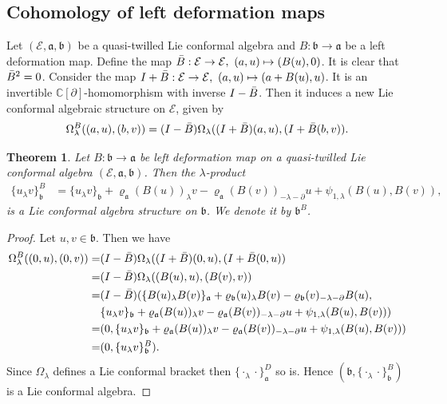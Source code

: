 \documentclass[a4paper,11pt]{article}
\def\Ep{\mathcal{E}}
\def\Vs{\mathfrak{a}}
\def\Ws{\mathfrak{b}}
\def\rep{\varrho}
\def\la{\lambda}
\def\p{\partial}
\numberwithin{equation}{section}
\newtheorem{theorem}{Theorem}[section]
\begin{document}
\subsection{Cohomology of left deformation maps}
\label{subsec:cohom-I}

Let $(\Ep,\Vs,\Ws)$ be a quasi-twilled Lie conformal algebra and
$B: \Ws\to\Vs$ be a left deformation map. Define the map $\Bar{B}: \Ep \to \Ep,\ (a,u) \mapsto (B(u),0)$. It is  clear that $\Bar{B}^2=0$. 
Consider the map $I+\Bar{B}: \Ep \to \Ep,\ (a,u) \mapsto (a+B(u),u)$. It is an invertible $\mathbb{C}[\partial]$-homomorphism with inverse $I-\Bar{B}$. Then it induces a new Lie conformal algebraic structure on $\Ep$, given by 
\begin{align*}
\Omega^B_\lambda((a,u) ,(b,v))=(I-\Bar{B})\Omega_\lambda((I+\Bar{B})(a,u), (I+\Bar{B}(b,v)).     
\end{align*}

\begin{theorem}
Let $B: \Ws \to \Vs$ be left deformation map on a quasi-twilled Lie conformal algebra $(\Ep,\Vs,\Ws)$. Then the $\la$-product 
\begin{align}
 \{u_\la v\}^B_\Ws
  &= \{u_\la v\}_\Ws + \rep_\Vs(B(u))_\la v - \rep_\Vs(B(v))_{-\la-\p}u
     + \psi_{1,\la}(B(u),B(v)), 
  \label{eq:induced-bracket-II}   
\end{align}
is a Lie conformal algebra structure on $\Ws$. We denote it by $\Ws^B$. 
\end{theorem}

\begin{proof}
Let $u,v \in \Ws$. Then we have
\begin{align*}
\Omega^B_\lambda((0,u) ,(0,v))=& (I-\Bar{B})\Omega_\lambda((I+\Bar{B})(0,u), (I+\Bar{B}(0,u))\\
=& (I-\Bar{B})\Omega_\lambda((B(u),u),(B(v),v)) \\
=&(I-\Bar{B})(\{B(u)_\la B(v)\}_\Vs
  + \rep_\Ws(u)_\la B(v) - \rep_\Ws(v)_{-\la-\p}B(u),\\
  & \{u_\la v\}_\Ws + \rep_\Vs(B(u))_\la v
             - \rep_\Vs(B(v))_{-\la-\p}u
             + \psi_{1,\la}(B(u),B(v))) \\
      =& (0,\{u_\la v\}_\Ws + \rep_\Vs(B(u))_\la v
             - \rep_\Vs(B(v))_{-\la-\p}u
             + \psi_{1,\la}(B(u),B(v))) \\ 
=& (0,\{u_\la v\}^B_\Ws).     
\end{align*}
Since $\Omega_\la$ defines a Lie conformal bracket then $\{\cdot_\la \cdot\}^D_\Vs$ so is. Hence $(\Ws,\{\cdot_\la \cdot\}^B_\Ws)$ is a Lie conformal algebra.

\end{proof}
\end{document}
